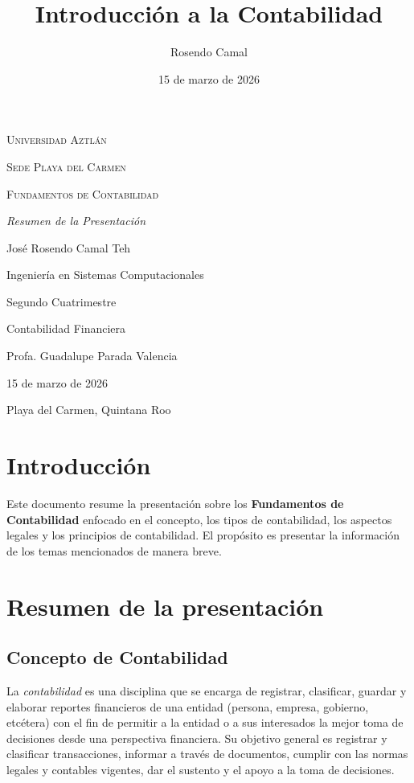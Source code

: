 \documentclass[letterpaper, 12pt]{article}
\title{Introducción a la Contabilidad}
\author{Rosendo Camal}
\date{15 de marzo de 2026}
\begin{document}
	\begin{titlepage}
		\centering
		{\scshape\LARGE Universidad Aztlán \par}
		\vspace{1cm}
		{\scshape\Large Sede Playa del Carmen \par}
		\vspace{3cm}
		{\scshape\Huge Fundamentos de Contabilidad \par}
		\vspace{1cm}
		{\itshape\Large Resumen de la Presentación \par}
		\vspace{3cm}
		{\Large José Rosendo Camal Teh \par}
		\vfill
		{\Large Ingeniería en Sistemas Computacionales \par}
		{\Large Segundo Cuatrimestre \par}
		{\Large Contabilidad Financiera \par}
		\vfill
		{\Large Profa. Guadalupe Parada Valencia \par}
		\vfill
		{\Large 15 de marzo de 2026 \par}
		\vfill
		{\Large Playa del Carmen, Quintana Roo \par}
	\end{titlepage}

	\section*{Introducción}
	
	Este documento resume la presentación sobre los \textbf{Fundamentos de Contabilidad} enfocado en el concepto, los tipos de contabilidad, los aspectos legales y los principios de contabilidad. El propósito es presentar la información de los temas mencionados de manera breve.
	
	\section*{Resumen de la presentación}

		\subsection*{Concepto de Contabilidad}
	
			La \emph{contabilidad} es una disciplina que se encarga de registrar, clasificar, guardar y elaborar reportes financieros de una entidad (persona, empresa, gobierno, etcétera) con el fin de permitir a la entidad o a sus interesados la mejor toma de decisiones desde una perspectiva financiera. Su objetivo general es registrar y clasificar transacciones, informar a través de documentos, cumplir con las normas legales y contables vigentes, dar el sustento y el apoyo a la toma de decisiones.
\end{document}
